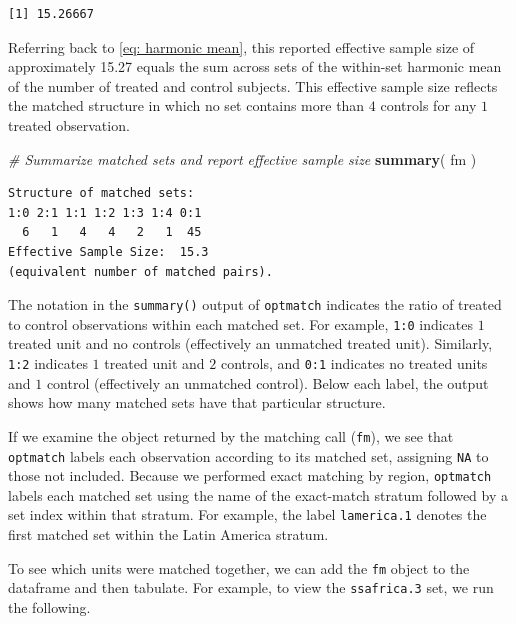 \documentclass[
  12pt,
  leqno]{article}
\newenvironment{Shaded}{\begin{snugshade}}{\end{snugshade}}
\newcommand{\CommentTok}[1]{\textcolor[rgb]{0.56,0.35,0.01}{\textit{#1}}}
\newcommand{\FunctionTok}[1]{\textcolor[rgb]{0.13,0.29,0.53}{\textbf{#1}}}
\newcommand{\NormalTok}[1]{#1}
\begin{document}
\begin{verbatim}
[1] 15.26667
\end{verbatim}

\doublespacing

Referring back to \eqref{eq: harmonic mean}, this reported effective
sample size of approximately 15.27 equals the sum across sets of the
within-set harmonic mean of the number of treated and control subjects.
This effective sample size reflects the matched structure in which no
set contains more than \(4\) controls for any \(1\) treated observation.

\singlespacing

\begin{Shaded}
\begin{Highlighting}[]
\CommentTok{\# Summarize matched sets and report effective sample size}
\FunctionTok{summary}\NormalTok{(}
\NormalTok{  fm}
\NormalTok{)}
\end{Highlighting}
\end{Shaded}

\begin{verbatim}
Structure of matched sets:
1:0 2:1 1:1 1:2 1:3 1:4 0:1 
  6   1   4   4   2   1  45 
Effective Sample Size:  15.3 
(equivalent number of matched pairs).
\end{verbatim}

\doublespacing

The notation in the \texttt{summary()} output of \texttt{optmatch}
indicates the ratio of treated to control observations within each
matched set. For example, \texttt{1:0} indicates \(1\) treated unit and
no controls (effectively an unmatched treated unit). Similarly,
\texttt{1:2} indicates \(1\) treated unit and \(2\) controls, and
\texttt{0:1} indicates no treated units and \(1\) control (effectively
an unmatched control). Below each label, the output shows how many
matched sets have that particular structure.

If we examine the object returned by the matching call (\texttt{fm}), we
see that \texttt{optmatch} labels each observation according to its
matched set, assigning \texttt{NA} to those not included. Because we
performed exact matching by region, \texttt{optmatch} labels each
matched set using the name of the exact-match stratum followed by a set
index within that stratum. For example, the label \texttt{lamerica.1}
denotes the first matched set within the Latin America stratum.

To see which units were matched together, we can add the \texttt{fm}
object to the dataframe and then tabulate. For example, to view the
\texttt{ssafrica.3} set, we run the following.
\end{document}
